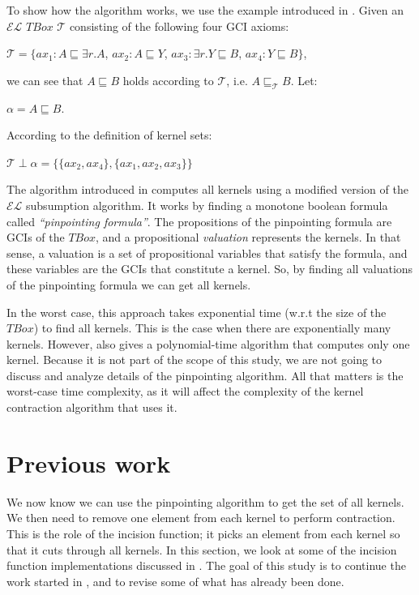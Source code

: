 To show how the algorithm works, we use the example introduced in \cite{pin}. Given an $\mathcal{EL}$ $TBox$ $\mathcal{T}$ consisting of the following four GCI axioms:
\begin{center}
$\mathcal{T} = \lbrace ax_1: A \sqsubseteq \exists{r}.A$, \hspace{7pt}  $ax_2: A \sqsubseteq Y$,  \hspace{7pt} $ax_3: \exists{r}.Y \sqsubseteq B$, \hspace{7pt} $ax_4: Y \sqsubseteq B \rbrace$,
\end{center}
we can see that $A \sqsubseteq B$ holds according to $\mathcal{T}$, i.e. $A \sqsubseteq_{\mathcal{T}} B$. Let: 
\begin{center} 
$\alpha = A \sqsubseteq B$.
\end{center}
According to the definition of kernel sets:
\begin{center}
$\mathcal{T} \perp \alpha = \lbrace \lbrace ax_2, ax_4 \rbrace, \lbrace ax_1, ax_2, ax_3 \rbrace \rbrace$
\end{center}
The algorithm introduced in \cite{pin} computes all kernels using a modified version of the $\mathcal{EL}$ subsumption algorithm. It works by finding a monotone boolean formula called \textit{``pinpointing formula''}. The propositions of the pinpointing formula are GCIs of the $TBox$, and a propositional \textit{valuation} represents the kernels. In that sense, a valuation is a set of propositional variables that satisfy the formula, and these variables are the GCIs that constitute a kernel. So, by finding all valuations of the pinpointing formula we can get all kernels.

In the worst case, this approach takes exponential time (w.r.t the size of the $TBox$) to find all kernels. This is the case when there are exponentially many kernels. However, \cite{pin} also gives a polynomial-time algorithm that computes only one kernel. Because it is not part of the scope of this study, we are not going to discuss and analyze details of the pinpointing algorithm. All that matters is the worst-case time complexity, as it will affect the complexity of the kernel contraction algorithm that uses it.


\section{Previous work}
We now know we can use the pinpointing algorithm to get the set of all kernels. We then need to remove one element from each kernel to perform contraction. This is the role of the incision function; it picks an element from each kernel so that it cuts through all kernels.
In this section, we look at some of the incision function implementations discussed in \cite{zwei}. The goal of this study is to continue the work started in \cite{zwei}, and to revise some of what has already been done. 

